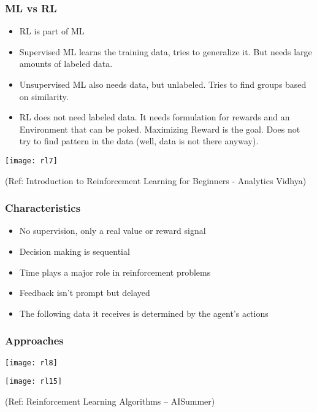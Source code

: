 \begin{frame}[fragile]\frametitle{ML vs RL}

\begin{itemize}
\item RL is part of ML
\item Supervised ML learns the training data, tries to generalize it. But needs large amounts of labeled data.
\item Unsupervised ML also needs data, but unlabeled. Tries to find groups based on similarity.
\item RL does not need labeled data. It needs formulation for rewards and an Environment that can be poked. Maximizing Reward is the goal. Does not try to find pattern in the data (well, data is not there anyway).
\end{itemize}

\begin{center}
\texttt{[image: rl7]}
\end{center}

{\tiny (Ref: Introduction to Reinforcement Learning for Beginners - Analytics Vidhya)} 

\end{frame}

\begin{frame}[fragile]\frametitle{Characteristics}
\begin{itemize}
\item No supervision, only a real value or reward signal
\item Decision making is sequential
\item Time plays a major role in reinforcement problems
\item Feedback isn’t prompt but delayed
\item The following data it receives is determined by the agent’s actions
\end{itemize}
\end{frame}


\begin{frame}[fragile]\frametitle{Approaches}

\begin{center}
\texttt{[image: rl8]}

\texttt{[image: rl15]}

\end{center}

{\tiny (Ref: Reinforcement Learning Algorithms – AISummer)} 


\end{frame}


